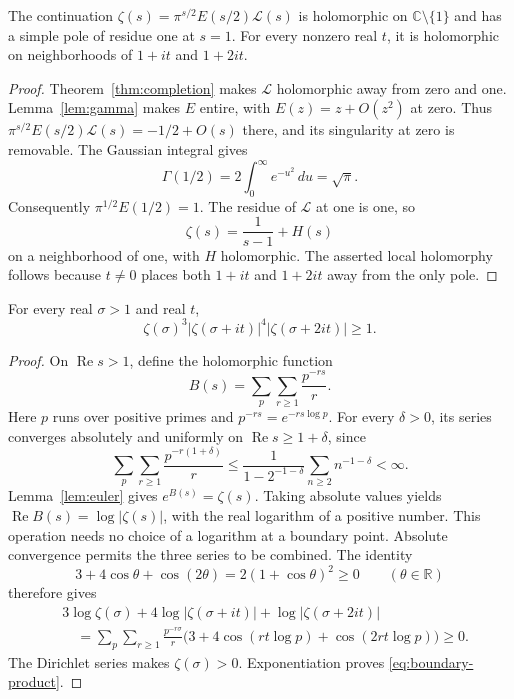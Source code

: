 \documentclass[11pt]{article}
\numberwithin{equation}{section}
\newcommand{\R}{\mathbb R}
\newcommand{\C}{\mathbb C}
\begin{document}
\begin{lemma}
\label{lem:boundary-germs}
The continuation
$\zeta(s)=\pi^{s/2}E(s/2)\mathcal L(s)$ is holomorphic on
$\C\setminus\{1\}$ and has a simple pole of residue one at $s=1$.
For every nonzero real $t$, it is holomorphic on neighborhoods of
$1+it$ and $1+2it$.
\end{lemma}
\begin{proof}
Theorem~\ref{thm:completion} makes $\mathcal L$ holomorphic away from
zero and one.  Lemma~\ref{lem:gamma} makes $E$ entire, with
$E(z)=z+O(z^2)$ at zero.
Thus $\pi^{s/2}E(s/2)\mathcal L(s)=-1/2+O(s)$ there, and its
singularity at zero is removable.
The Gaussian integral gives
\[
 \Gamma(1/2)=2\int_0^\infty e^{-u^2}\,du=\sqrt\pi.
\]
Consequently $\pi^{1/2}E(1/2)=1$.
The residue of $\mathcal L$ at one is one, so
\begin{equation}
 \zeta(s)=\frac1{s-1}+H(s)
 \label{eq:boundary-pole}
\end{equation}
on a neighborhood of one, with $H$ holomorphic.
The asserted local holomorphy follows because $t\ne0$ places both
$1+it$ and $1+2it$ away from the only pole.
\end{proof}

\begin{lemma}
\label{lem:boundary-prime}
For every real $\sigma>1$ and real $t$,
\begin{equation}
 \zeta(\sigma)^3
 |\zeta(\sigma+it)|^4|\zeta(\sigma+2it)|\geq1.
 \label{eq:boundary-product}
\end{equation}
\end{lemma}
\begin{proof}
On $\operatorname{Re}s>1$, define the holomorphic function
\[
 B(s)=\sum_p\sum_{r\geq1}\frac{p^{-rs}}r.
\]
Here $p$ runs over positive primes and $p^{-rs}=e^{-rs\log p}$.
For every $\delta>0$, its series converges absolutely and uniformly on
$\operatorname{Re}s\geq1+\delta$, since
\[
 \sum_p\sum_{r\geq1}\frac{p^{-r(1+\delta)}}r
 \leq\frac1{1-2^{-1-\delta}}\sum_{n\geq2}n^{-1-\delta}<\infty.
\]
Lemma~\ref{lem:euler} gives $e^{B(s)}=\zeta(s)$.
Taking absolute values yields $\operatorname{Re}B(s)=\log|\zeta(s)|$,
with the real logarithm of a positive number.
This operation needs no choice of a logarithm at a boundary point.
Absolute convergence permits the three series to be combined.
The identity
\[
 3+4\cos\theta+\cos(2\theta)=2(1+\cos\theta)^2\geq0
 \qquad(\theta\in\R)
\]
therefore gives
\begin{align*}
 &3\log\zeta(\sigma)+4\log|\zeta(\sigma+it)|
                      +\log|\zeta(\sigma+2it)|\\
 &\quad=\sum_p\sum_{r\geq1}\frac{p^{-r\sigma}}r
       \bigl(3+4\cos(rt\log p)+\cos(2rt\log p)\bigr)\geq0.
\end{align*}
The Dirichlet series makes $\zeta(\sigma)>0$.
Exponentiation proves \eqref{eq:boundary-product}.
\end{proof}
\end{document}

